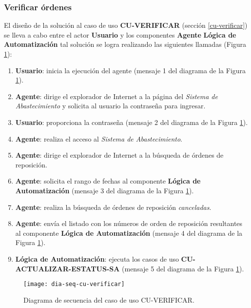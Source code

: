 \subsubsection{Verificar órdenes}
El diseño de la solución al caso de uso \textbf{CU-VERIFICAR} (sección \ref{cu-verificar}) se lleva a cabo entre el actor \textbf{Usuario} y los componentes \textbf{Agente} \textbf{Lógica de Automatización} tal solución se logra realizando las siguientes llamadas (Figura \ref{fig:dia-seq-cu-verificar}):
\begin{enumerate}
	\item \textbf{Usuario}: inicia la ejecución del agente (mensaje 1 del diagrama de la Figura \ref{fig:dia-seq-cu-verificar}).
	\item \textbf{Agente}: dirige el explorador de Internet a la página del \textit{Sistema de Abastecimiento} y solicita al usuario la contraseña para ingresar.
	\item \textbf{Usuario}: proporciona la contraseña (mensaje 2 del diagrama de la Figura \ref{fig:dia-seq-cu-verificar}).
	\item \textbf{Agente}: realiza el acceso al \textit{Sistema de Abastecimiento}.
	\item \textbf{Agente}: dirige el explorador de Internet a la búsqueda de órdenes de reposición.
	\item \textbf{Agente}: solicita el rango de fechas al componente \textbf{Lógica de Automatización} (mensaje 3 del diagrama de la Figura \ref{fig:dia-seq-cu-verificar}).
	\item \textbf{Agente}: realiza la búsqueda de órdenes de reposición \textit{canceladas}.
	\item \textbf{Agente}: envía el listado con los números de orden de reposición resultantes al componente \textbf{Lógica de Automatización} (mensaje 4 del diagrama de la Figura \ref{fig:dia-seq-cu-verificar}).
	\item \textbf{Lógica de Automatización}: ejecuta los casos de uso \textbf{CU-ACTUALIZAR-ESTATUS-SA} (mensaje 5 del diagrama de la Figura \ref{fig:dia-seq-cu-verificar}).
\end{enumerate}

\begin{figure}[h]
	\centering
	\texttt{[image: dia-seq-cu-verificar]}
	\caption{Diagrama de secuencia del caso de uso CU-VERIFICAR.}
	\label{fig:dia-seq-cu-verificar}
\end{figure}

